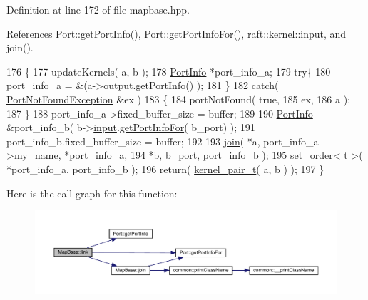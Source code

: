 Definition at line 172 of file mapbase.\+hpp.



References Port\+::get\+Port\+Info(), Port\+::get\+Port\+Info\+For(), raft\+::kernel\+::input, and join().


\begin{DoxyCode}
176    \{
177       updateKernels( a, b );
178       \hyperlink{struct_port_info}{PortInfo} *port\_info\_a;
179       \textcolor{keywordflow}{try}\{
180          port\_info\_a = &(a->output.\hyperlink{class_port_a4af1cb062940ca3b83c569f024b9a8d1}{getPortInfo}() );
181       \}
182       \textcolor{keywordflow}{catch}( \hyperlink{class_port_not_found_exception}{PortNotFoundException} &ex ) 
183       \{
184             portNotFound( \textcolor{keyword}{true},
185                           ex,
186                           a );
187       \}
188       port\_info\_a->fixed\_buffer\_size = buffer;
189       
190       \hyperlink{struct_port_info}{PortInfo} &port\_info\_b( b->\hyperlink{classraft_1_1kernel_a6edbe35a56409d402e719b3ac36d6554}{input}.\hyperlink{class_port_afb426a015195fa9b4b5b1d1200daf8ed}{getPortInfoFor}( b\_port) );
191       port\_info\_b.fixed\_buffer\_size = buffer;
192       
193       \hyperlink{class_map_base_a2624d7b81f0078dcc78e524045403e28}{join}( *a, port\_info\_a->my\_name, *port\_info\_a, 
194             *b, b\_port, port\_info\_b );
195       set\_order< t >( *port\_info\_a, port\_info\_b ); 
196       \textcolor{keywordflow}{return}( \hyperlink{classkernel__pair__t}{kernel\_pair\_t}( a, b ) );
197    \}
\end{DoxyCode}
Here is the call graph for this function\+:
\nopagebreak
\begin{figure}[H]
\begin{center}
\leavevmode
\includegraphics[width=350pt]{class_map_base_a19a0a2f6842a863327920776457c52bf_cgraph}
\end{center}
\end{figure}
\hypertarget{class_map_base_af06481b99a96e3c5ae8da88cc8a78e91}{}\label{class_map_base_af06481b99a96e3c5ae8da88cc8a78e91} 
